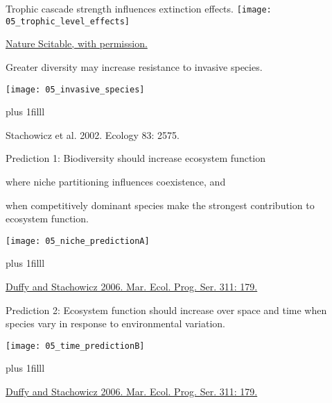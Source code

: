 \documentclass[t]{beamer}
\begin{document}
%
\begin{frame}[t]{Trophic cascade strength influences extinction effects.}
	\centering
	\texttt{[image: 05\_trophic\_level\_effects]}
	
	\vfilll
	
	\hfill \tiny \href{http://www.nature.com/scitable/knowledge/library/biodiversity-and-ecosystem-services-is-it-the-96677163}{\textcopyright Nature Scitable, with permission.}
\end{frame}
%
%
\begin{frame}[t]{Greater diversity may increase resistance to invasive species.}

	\centering\texttt{[image: 05\_invasive\_species]}
	
	\vskip0pt plus 1filll
	
	\hfill \tiny Stachowicz et al. 2002. Ecology 83: 2575.
\end{frame}
%
\begin{frame}[t]{Prediction 1: Biodiversity should increase ecosystem function }
	\begin{multicols}{2}
		where niche partitioning influences coexistence, and
		
		\vspace*{2\baselineskip}
		
		when competitively dominant species make the strongest contribution to ecosystem function.
		
	\columnbreak
		\texttt{[image: 05\_niche\_predictionA]}
		
	\end{multicols}
	\vskip0pt plus 1filll
	
	\hfill \tiny \href{http://www.int-res.com/articles/meps_oa/m311p179.pdf}{Duffy and Stachowicz 2006. Mar. Ecol. Prog. Ser. 311: 179.}
\end{frame}
%
\begin{frame}[t]{Prediction 2: Ecosystem function should increase over space and time when species vary in response to environmental variation.}
	
	\centering	
	
	\texttt{[image: 05\_time\_predictionB]}
	
	\vskip0pt plus 1filll
	
	\hfill \tiny \href{http://www.int-res.com/articles/meps_oa/m311p179.pdf}{Duffy and Stachowicz 2006. Mar. Ecol. Prog. Ser. 311: 179.}

\end{frame}
\end{document}
